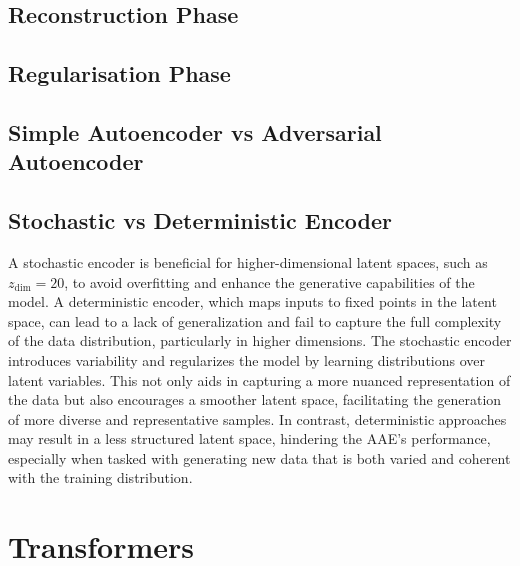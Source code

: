 \documentclass[a4paper]{article}
\begin{document}
\subsection{Reconstruction Phase}

\subsection{Regularisation Phase}

\subsection{Simple Autoencoder vs Adversarial Autoencoder}

\subsection{Stochastic vs Deterministic Encoder}
A stochastic encoder is beneficial for higher-dimensional latent spaces, such as \( z_{\text{dim}} = 20 \), to avoid
overfitting and enhance the generative capabilities of the model. A deterministic encoder, which maps inputs to fixed points
in the latent space, can lead to a lack of generalization and fail to capture the full complexity of the data distribution,
particularly in higher dimensions. The stochastic encoder introduces variability and regularizes the model by learning
distributions over latent variables. This not only aids in capturing a more nuanced representation of the data but also
encourages a smoother latent space, facilitating the generation of more diverse and representative samples. In contrast,
deterministic approaches may result in a less structured latent space, hindering the AAE's performance, especially when
tasked with generating new data that is both varied and coherent with the training distribution.

\section{Transformers}
\end{document}
